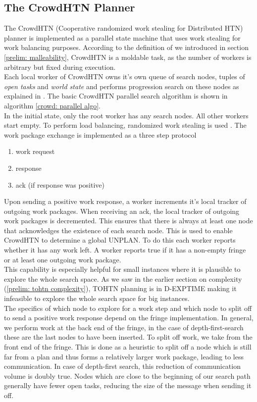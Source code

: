 \subsection{The CrowdHTN Planner}
\label{prelim: crowdhtn}
The CrowdHTN (Cooperative randomized work stealing for Distributed HTN) planner is implemented as a parallel state machine that uses work stealing for work balancing purposes. According to the definition of \cite{feitelson1997job} we introduced in section \ref{prelim: malleability}, CrowdHTN is a moldable task, as the number of workers is arbitrary but fixed during execution. \\
Each local worker of CrowdHTN owns it's own queue of search nodes, tuples of \textit{open tasks} and \textit{world state} and performs progression search on these nodes as explained in . The basic CrowdHTN parallel search algorithm is shown in algorithm \ref{crowd: parallel algo}. \\
In the initial state, only the root worker has any search nodes. All other workers start empty. To perform load balancing, randomized work stealing is used . The work package exchange is implemented as a three step protocol
\begin{enumerate}
	\item work request
	\item response
	\item ack (if response was positive)
\end{enumerate}
Upon sending a positive work response, a worker increments it's local tracker of outgoing work packages. When receiving an ack, the local tracker of outgoing work packages is decremented. This ensures that there is always at least one node that acknowledges the existence of each search node. This is used to enable CrowdHTN to determine a global UNPLAN. To do this each worker reports whether it has any work left. A worker reports true if it has a non-empty fringe or at least one outgoing work package. \\
This capability is especially helpful for small instances where it is plausible to explore the whole search space. As we saw in the earlier section on complexity (\ref{prelim: tohtn complexity}), TOHTN planning is in D-EXPTIME making it infeasible to explore the whole search space for big instances.\\ 
The specifics of which node to explore for a work step and which node to split off to send a positive work response depend on the fringe implementation. In general, we perform work at the back end of the fringe, in the case of depth-first-search these are the last nodes to have been inserted. To split off work, we take from the front end of the fringe. This is done as a heuristic to split off a node which is still far from a plan and thus forms a relatively larger work package, leading to less communication. In case of depth-first search, this reduction of communication volume is doubly true. Nodes which are close to the beginning of our search path generally have fewer open tasks, reducing the size of the message when sending it off.
